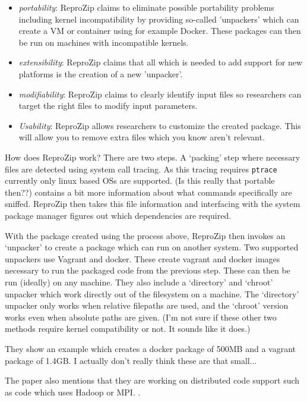\documentclass[american]{article}
\begin{document}
\begin{itemize}
\item \textit{portability}: ReproZip claims to eliminate possible portability problems including kernel incompatibility by providing so-called 'unpackers' which can create a VM or container using for example Docker. These packages can then be run on machines with incompatible kernels.\cite{reprozip}
\item \textit{extensibility}: ReproZip claims that all which is needed to add support for new platforms is the creation of a new 'unpacker'.\cite{reprozip}
\item \textit{modifiability}: ReproZip claims to clearly identify input files so researchers can target the right files to modify input parameters.\cite{reprozip}
\item \textit{Usability}: ReproZip allows researchers to customize the created package. This will allow you to remove extra files which you know aren't relevant.\cite{reprozip}
\end{itemize}

How does ReproZip work? There are two steps. A `packing' step where necessary files are detected using system call tracing. As this tracing requires \texttt{ptrace} currently only linux based OSs are supported\cite{reprozip}. (Is this really that portable then??) \cite{reprozip} contains a bit more information about what commands specifically are sniffed. ReproZip then takes this file information and interfacing with the system package manager figures out which dependencies are required.

With the package created using the process above, ReproZip then invokes an `unpacker' to create a package which can run on another system. Two supported unpackers use Vagrant and docker. These create vagrant and docker images necessary to run the packaged code from the previous step. These can then be run (ideally) on any machine. They also include a `directory' and `chroot' unpacker which work directly out of the filesystem on a machine. The `directory' unpacker only works when relative filepaths are used, and the `chroot' version works even when absolute paths are given. (I'm not sure if these other two methods require kernel compatibility or not. It sounds like it does.) \cite{reprozip}

They show an example which creates a docker package of 500MB and a vagrant package of 1.4GB. I actually don't really think these are that small...

The paper also mentions that they are working on distributed code support such as code which uses Hadoop or MPI. \cite{reprozip}.
\end{document}
